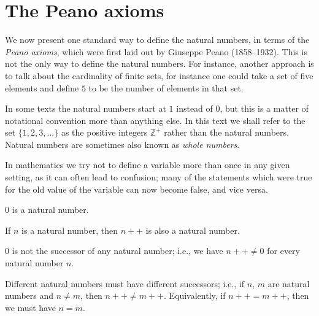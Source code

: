 \section{The Peano axioms}

\begin{note}
We now present one standard way to define the natural numbers, in terms of the \emph{Peano axioms}, which were first laid out by Giuseppe Peano (1858–1932).
This is not the only way to define the natural numbers.
For instance, another approach is to talk about the cardinality of finite sets, for instance one could take a set of five elements and define \(5\) to be the number of elements in that set.
\end{note}

\begin{note}
In some texts the natural numbers start at \(1\) instead of \(0\), but this is a matter of notational convention more than anything else.
In this text we shall refer to the set \(\{1, 2, 3,...\}\) as the positive integers \(\mathds{Z}^+\) rather than the natural numbers.
Natural numbers are sometimes also known as \emph{whole numbers}.
\end{note}

\begin{note}
In mathematics we try not to define a variable more than once in any given setting, as it can often lead to confusion;
many of the statements which were true for the old value of the variable can now become false, and vice versa.
\end{note}

\begin{axiom}\label{2.1}
\(0\) is a natural number.
\end{axiom}

\begin{axiom}\label{2.2}
If \(n\) is a natural number, then \(n++\) is also a natural number.
\end{axiom}

\begin{axiom}\label{2.3}
\(0\) is not the successor of any natural number;
i.e., we have \(n++ \neq 0\) for every natural number \(n\).
\end{axiom}

\begin{axiom}\label{2.4}
Different natural numbers must have different successors;
i.e., if \(n\), \(m\) are natural numbers and \(n \neq m\), then \(n++ \neq m++\).
Equivalently, if \(n++ = m++\), then we must have \(n = m\).
\end{axiom}

